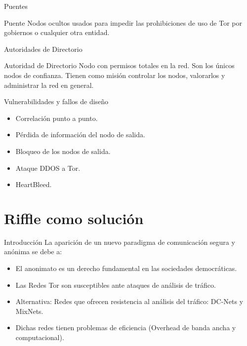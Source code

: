 \documentclass[10pt]{beamer}
\begin{document}
\begin{frame}[fragile]{Puentes}
	\pause
	\begin{block}{Puente}
		Nodos ocultos usados para impedir las prohibiciones de uso de Tor por gobiernos o cualquier otra entidad.
	\end{block}
\end{frame}

\begin{frame}[fragile]{Autoridades de Directorio}
	\pause
	\begin{block}{Autoridad de Directorio}
		Nodo con permisos totales en la red. Son los únicos nodos de confianza. Tienen como misión controlar los nodos, valorarlos y administrar la red en general.
	\end{block}
\end{frame}

\begin{frame}[fragile]{Vulnerabilidades y fallos de diseño}
	\pause
	\begin{itemize}
		\item<1-> Correlación punto a punto.\pause
		\item<2-> Pérdida de información del nodo de salida.\pause
		\item<3-> Bloqueo de los nodos de salida.\pause
		\item<4-> Ataque DDOS a Tor.\pause
		\item<5-> HeartBleed.\pause
	\end{itemize}
\end{frame}



\section{Riffle como solución}

\begin{frame}[fragile]{Introducción}
	\pause
	La aparición de un nuevo paradigma de comunicación segura y anónima se debe a: \pause
	\begin{itemize}
		\item<1-> El anonimato es un derecho fundamental en las sociedades democráticas. \pause
		\item<2-> Las Redes Tor son susceptibles ante ataques de análisis de tráfico. \pause 
		\item<3-> Alternativa: Redes que ofrecen resistencia al análisis del tráfico: DC-Nets y MixNets. \pause
		\item<4-> Dichas redes tienen problemas de eficiencia (Overhead de banda ancha y computacional).
	\end{itemize}
\end{frame}
\end{document}
